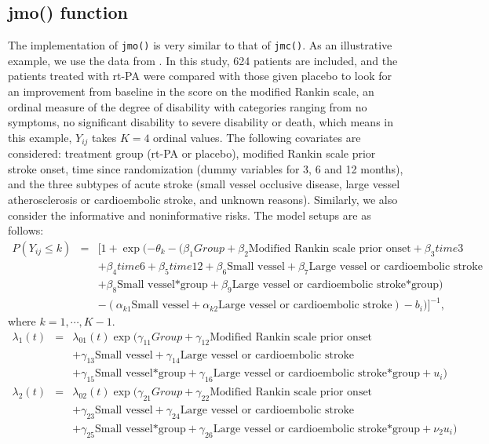 \subsection{jmo() function}

The implementation of \texttt{jmo()} is very similar to that of \texttt{jmc()}. As an illustrative example, we use the data from \citep{national1995tissue}. In this study, 624 patients are included, and the patients treated with rt-PA were compared with those given placebo to look for an improvement from baseline in the score on the modified Rankin scale, an ordinal measure of the degree of disability with categories ranging from no symptoms, no significant disability to severe disability or death, which means in this example, $Y_{ij}$ takes $K=4$ ordinal values. The following covariates are considered: treatment group (rt-PA or placebo), modified Rankin scale prior stroke onset, time since randomization (dummy variables for 3, 6 and 12 months), and the three subtypes of acute stroke (small vessel occlusive disease, large vessel atherosclerosis or cardioembolic stroke, and unknown reasons). Similarly, we also consider the informative and noninformative risks. The model setups are as follows:
\begin{eqnarray*}
P(Y_{ij}\leq k)&=&[1+\exp(-\theta_{k}-(\beta_1Group+\beta_2\mbox{Modified Rankin scale prior onset}+\beta_3time3\\
&&+\beta_4time6+\beta_5time12+\beta_6\mbox{Small vessel}+\beta_7\mbox{Large vessel or cardioembolic stroke}\\
&&+\beta_8 \mbox{Small vessel*group}+\beta_9\mbox{Large vessel or cardioembolic stroke*group})\\
&&-(\alpha_{k1}\mbox{Small vessel}+\alpha_{k2}\mbox{Large vessel or cardioembolic stroke})-b_i)]^{-1},
\end{eqnarray*}
where $k=1,\cdots,K-1$.
\begin{eqnarray*}
\lambda_1(t)&=&\lambda_{01}(t)\exp(\gamma_{11}Group+\gamma_{12}\mbox{Modified Rankin scale prior onset}\\
&&+\gamma_{13}\mbox{Small vessel}+\gamma_{14}\mbox{Large vessel or cardioembolic stroke}\\
&&+\gamma_{15} \mbox{Small vessel*group}+\gamma_{16}\mbox{Large vessel or cardioembolic stroke*group}+u_i)\\
\lambda_2(t)&=&\lambda_{02}(t)\exp(\gamma_{21}Group+\gamma_{22}\mbox{Modified Rankin scale prior onset}\\
&&+\gamma_{23}\mbox{Small vessel}+\gamma_{24}\mbox{Large vessel or cardioembolic stroke}\\
&&+\gamma_{25} \mbox{Small vessel*group}+\gamma_{26}\mbox{Large vessel or cardioembolic stroke*group}+\nu_2u_i)
\end{eqnarray*}

